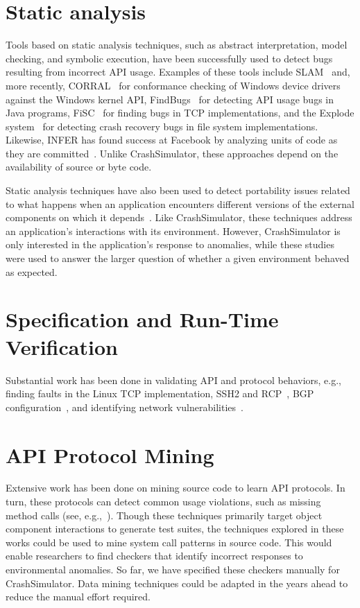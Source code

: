 \section{Static analysis}
Tools based on static analysis techniques, such as abstract interpretation,
model checking, and symbolic execution, have been successfully
used to
detect bugs resulting from incorrect API usage. Examples of these tools
include
SLAM~\cite{Ball_adecade, Ball:2002:SLP:503272.503274} and, more recently,
CORRAL~\cite{DBLP:conf/sigsoft/LalQ14} for conformance checking of Windows
device drivers against the Windows kernel API,
FindBugs~\cite{DBLP:conf/oopsla/HovemeyerP04} for detecting API usage bugs
in Java programs, FiSC~\cite{Musuvathi04modelchecking} for finding bugs in
TCP implementations, and the Explode
system~\cite{Yang:2006:ELG:1298455.1298469} for detecting crash recovery
bugs in file system implementations.  Likewise, INFER has found success at
Facebook by analyzing units of code as they are
committed~\cite{INFERFacebook}. Unlike CrashSimulator, these
approaches depend on the availability of source or byte code.

Static analysis techniques have also been
used to detect portability issues related to what happens when an
application encounters different
versions of the external components on which
it depends~\cite{silakov2010improving, javacompliance-www}. Like
CrashSimulator, these techniques
address an application's interactions with its
environment. However, CrashSimulator is only interested in the application's
response to anomalies, while  these studies were used to answer the larger question of whether a given 
environment behaved as expected.


\section{Specification and Run-Time Verification}
Substantial work has been done in validating API and protocol behaviors,
e.g., finding faults in the Linux TCP implementation, SSH2 and
RCP~\cite{Udrea:2008}, BGP configuration~\cite{Feamster:2005}, and
identifying network vulnerabilities~\cite{ritchey-sp00}.
\fi

\section{API Protocol Mining}
Extensive work has been done on mining source code to learn API protocols. In turn, these protocols can detect
common usage violations, such as missing method calls
(see, e.g.,~\cite{mariani2007compatibility,
DBLP:journals/ase/WasylkowskiZ11, DBLP:conf/icse/PradelJAG12,
DBLP:journals/tosem/MonperrusM13, DBLP:conf/icse/JamrozikSZ16}). Though these
techniques primarily target object component interactions to generate test suites, the techniques explored in
these works could be used to mine system call patterns in source code.
This would enable researchers
to find checkers that identify incorrect responses to environmental
anomalies. So far, we have specified these checkers manually for
CrashSimulator.  Data mining techniques could be adapted in the years
ahead to reduce the manual effort required.

